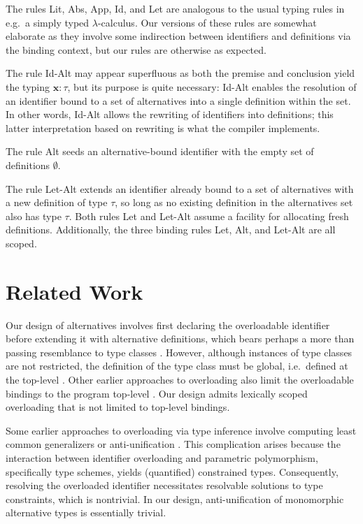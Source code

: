 \documentclass{article}
\renewcommand{\=}{\triangleq}
\begin{document}
The rules {\sc Lit}, {\sc Abs}, {\sc App}, {\sc Id}, and {\sc Let}
are analogous to the usual typing rules in
e.g.~a simply typed $\lambda$-calculus.
Our versions of these rules are somewhat elaborate as they involve some
indirection between identifiers and definitions via the binding context,
but our rules are otherwise as expected.

The rule {\sc Id-Alt} may appear superfluous as both the premise and
conclusion yield the typing $\textbf{x} : \tau$,
but its purpose is quite necessary:
{\sc Id-Alt} enables the resolution of an identifier bound to a set of
alternatives into a single definition within the set.
In other words,
{\sc Id-Alt} allows the rewriting of identifiers into definitions;
this latter interpretation based on rewriting is what the compiler
implements.

The rule {\sc Alt} seeds an alternative-bound identifier with the
empty set of definitions $\emptyset$.

The rule {\sc Let-Alt} extends an identifier already bound to a set of
alternatives with a new definition of type $\tau$,
so long as no existing definition in the alternatives set also has type $\tau$.
Both rules {\sc Let} and {\sc Let-Alt} assume a facility for allocating fresh
definitions.
Additionally, the three binding rules {\sc Let}, {\sc Alt}, and {\sc Let-Alt}
are all scoped.

\section{Related Work}

Our design of alternatives involves first declaring the overloadable
identifier before extending it with alternative definitions,
which bears perhaps a more than passing resemblance to type classes
\cite{wadler89}.
However, although instances of type classes are not restricted,
the definition of the type class must be global,
i.e.~defined at the top-level \cite{loh06}.
Other earlier approaches to overloading also limit the overloadable bindings
to the program top-level
\cite{odersky95}.
Our design admits lexically scoped overloading that is not limited to
top-level bindings.

Some earlier approaches to overloading via type inference involve computing
least common generalizers or anti-unification
\cite{smith94,camarao99}.
This complication arises because the interaction between identifier overloading
and parametric polymorphism, specifically type schemes,
yields (quantified) constrained types.
Consequently, resolving the overloaded identifier necessitates resolvable
solutions to type constraints, which is nontrivial.
In our design,
anti-unification of monomorphic alternative types is essentially trivial.
\end{document}

